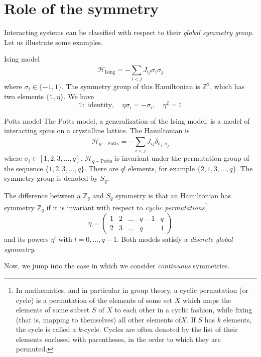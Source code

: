 \documentclass[../main/main.tex]{subfiles}
\begin{document}
\section{Role of the symmetry}
Interacting systems can be classified with respect to their \emph{global symmetry group}. Let us illustrate some examples.
\begin{example}{Ising model}{}
  \begin{equation}
    \mathcal{H}_{\text{Ising}} = - \sum_{i<j}^{} J_{ij} \sigma _i \sigma _j
  \end{equation}
  where \( \sigma _i \in \{ -1,1 \}   \). The symmetry group of this Hamiltonian is \( \mathbb{Z}^2 \), which has two elements \( \{ \mathbb{1}, \eta  \}   \). We have
  \begin{equation*}
    \mathbb{1}: \text{ identity}, \quad \eta \sigma _i = - \sigma _i, \quad \eta ^2 = \mathbb{1}
  \end{equation*}
\end{example}
\begin{example}{Potts model}{}
The Potts model, a generalization of the Ising model, is a model of interacting spins on a crystalline lattice. The Hamiltonian is 
  \begin{equation}
    \mathcal{H}_{q- \text{Potts}} = - \sum_{i<j}^{} J_{ij} \delta _{\sigma _i, \sigma _j}
  \end{equation}
  where \( \sigma _i \in [1,2,3,\dots,q] \). \( \mathcal{H}_{q- \text{Potts}} \)  is invariant under the permutation group of the sequence \( \{ 1,2,3,\dots,q \}   \). There are \( q! \) elements, for example \( \{ 2,1,3,\dots,q \}   \). The symmetry group is denoted by \( S_q \).
\end{example}
\begin{remark}
The difference between a \( \mathbb{Z}_q \) and \( S_q \) symmetry is that an Hamiltonian has symmetry \( \mathbb{Z}_q \) if it is invariant with respect to \emph{cyclic permutations}\footnote{In mathematics, and in particular in group theory, a cyclic permutation (or cycle) is a permutation of the elements of some set \(X\) which maps the elements of some subset \(S\) of \(X\) to each other in a cyclic fashion, while fixing (that is, mapping to themselves) all other elements of\(X\). If \(S\) has \(k\) elements, the cycle is called a \(k\)-cycle. Cycles are often denoted by the list of their elements enclosed with parentheses, in the order to which they are permuted.}
\begin{equation}
  \eta = \begin{pmatrix}
    1 & 2 & \dots & q-1 & q \\
    2 & 3 & \dots & q & 1
  \end{pmatrix}
\end{equation}
and its powers \( \eta ^l \) with \( l=0, \dots, q-1 \). Both models satisfy a \emph{discrete global symmetry}.
\end{remark}
Now, we jump into the case in which we consider \emph{continuous} symmetries.
\end{document}
